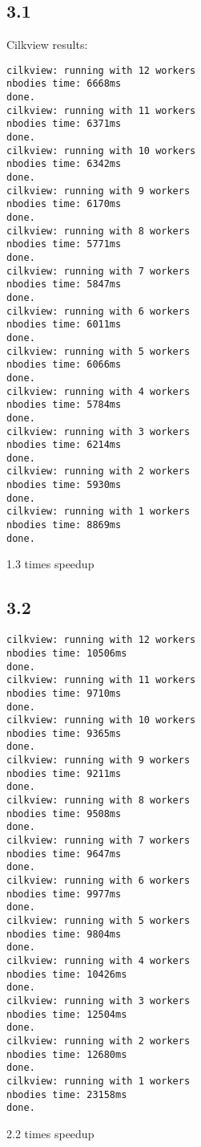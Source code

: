 \documentclass[12pt]{article}
\begin{document}
\subsection{3.1}
Cilkview results:
\begin{verbatim}
cilkview: running with 12 workers
nbodies time: 6668ms
done.
cilkview: running with 11 workers
nbodies time: 6371ms
done.
cilkview: running with 10 workers
nbodies time: 6342ms
done.
cilkview: running with 9 workers
nbodies time: 6170ms
done.
cilkview: running with 8 workers
nbodies time: 5771ms
done.
cilkview: running with 7 workers
nbodies time: 5847ms
done.
cilkview: running with 6 workers
nbodies time: 6011ms
done.
cilkview: running with 5 workers
nbodies time: 6066ms
done.
cilkview: running with 4 workers
nbodies time: 5784ms
done.
cilkview: running with 3 workers
nbodies time: 6214ms
done.
cilkview: running with 2 workers
nbodies time: 5930ms
done.
cilkview: running with 1 workers
nbodies time: 8869ms
done.
\end{verbatim}
1.3 times speedup

\subsection{3.2}
\begin{verbatim}
cilkview: running with 12 workers
nbodies time: 10506ms
done.
cilkview: running with 11 workers
nbodies time: 9710ms
done.
cilkview: running with 10 workers
nbodies time: 9365ms
done.
cilkview: running with 9 workers
nbodies time: 9211ms
done.
cilkview: running with 8 workers
nbodies time: 9508ms
done.
cilkview: running with 7 workers
nbodies time: 9647ms
done.
cilkview: running with 6 workers
nbodies time: 9977ms
done.
cilkview: running with 5 workers
nbodies time: 9804ms
done.
cilkview: running with 4 workers
nbodies time: 10426ms
done.
cilkview: running with 3 workers
nbodies time: 12504ms
done.
cilkview: running with 2 workers
nbodies time: 12680ms
done.
cilkview: running with 1 workers
nbodies time: 23158ms
done.
\end{verbatim}
2.2 times speedup
\end{document}
